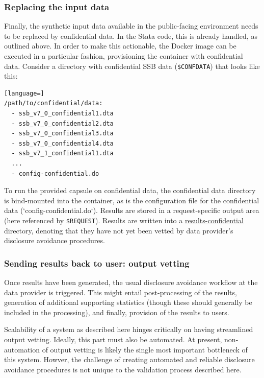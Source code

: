 \documentclass{article}
\begin{document}
\subsubsection{Replacing the input data}

Finally, the synthetic input data available in the public-facing environment needs to be replaced by confidential data. In the Stata code, this is already handled, as outlined above. In order to make this actionable, the Docker image can be executed in a particular fashion, provisioning the container with confidential data. Consider a directory with confidential SSB data (\texttt{\$CONFDATA}) that looks like this:

\begin{lstlisting}[language=]
/path/to/confidential/data:
  - ssb_v7_0_confidential1.dta
  - ssb_v7_0_confidential2.dta
  - ssb_v7_0_confidential3.dta
  - ssb_v7_0_confidential4.dta
  - ssb_v7_1_confidential1.dta
  ...
  - config-confidential.do   
\end{lstlisting}

To run the provided capsule on confidential data, the confidential data directory is  bind-mounted into the container, as is the configuration file for the confidential data (`config-confidential.do`). Results are stored in a request-specific output area (here referenced by \texttt{\$REQUEST}). Results are written into a \url{results-confidential} directory, denoting that they have not yet been vetted by data provider's disclosure avoidance procedures.








\subsubsection{Sending results back to user: output vetting}

Once results have been generated, the usual disclosure avoidance workflow at the data provider is triggered. This might entail post-processing of the results, generation of additional supporting statistics (though these should generally be included in the processing), and finally, provision of the results to users. 

Scalability of a system as described here hinges critically on having streamlined output vetting. Ideally, this  part must also be automated. At present, non-automation of output vetting is likely the single most important bottleneck of this system. Howver, the challenge of creating automated and reliable disclosure avoidance procedures is  not unique to the validation process described here.
\end{document}

